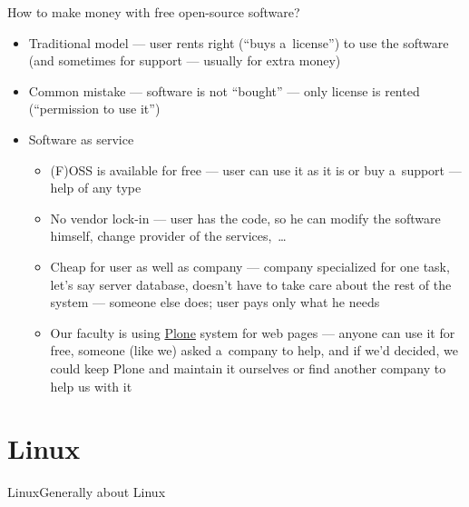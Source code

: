 \documentclass[compress, ucs, xelatex, 11pt, xcolor=svgnames,
  hyperref={
    bookmarks=true,
    unicode=true,
    colorlinks=true,
    pdftitle={Linux, command line and MetaCentrum},
    plainpages=false,
    pdfauthor={Vojtech Zeisek},
    pdfsubject={Course about use of Linux command line, writing shell scripts and using MetaCentrum of CESNET},
    pdfcreator={XeLaTeX},
    pdfkeywords={Linux, GNU, BASH, shell, command line, MetaCentrum},
    linkcolor=DarkRed,
    anchorcolor=DarkBlue,
    citecolor=Indigo,
    filecolor=NavyBlue,
    menucolor=DarkMagenta,
    urlcolor=DarkBlue,
    pdftex},
  url={hyphens, lowtilde} %
  ]{beamer}
\begin{document}
\begin{frame}{How to make money with free open-source software?}
  \begin{itemize}
    \item Traditional model --- user rents right (``buys a~license'') to use the software (and sometimes for support --- usually for extra money)
    \item Common mistake --- software is not ``bought'' --- only license is rented (``permission to use it'')
    \item Software as service
    \begin{itemize}
      \item (F)OSS is available for free --- user can use it as it is or buy a~support --- help of any type
      \item No vendor lock-in --- user has the code, so he can modify the software himself, change provider of the services,~\ldots
      \item Cheap for user as well as company --- company specialized for one task, let's say server database, doesn't have to take care about the rest of the system --- someone else does; user pays only what he needs
      \item Our faculty is using \href{https://plone.org/}{Plone} system for web pages --- anyone can use it for free, someone (like we) asked a~company to help, and if we'd decided, we  could keep Plone and maintain it ourselves or find another company to help us with it
    \end{itemize}
  \end{itemize}
\end{frame}

\section{Linux}

\begin{frame}{Linux}{Generally about Linux}
  \tableofcontents[currentsection, sectionstyle=show/hide, hideothersubsections]
\end{frame}
\end{document}
